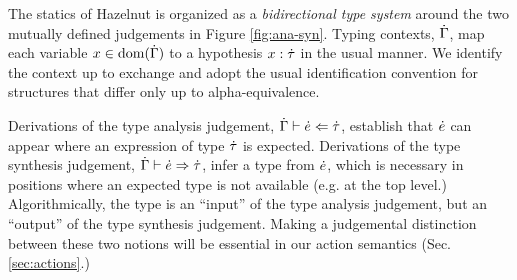 The statics of Hazelnut is organized as a \emph{bidirectional type system} \cite{Pierce:2000:LTI:345099.345100,bidi-tutorial} around the two mutually defined judgements in Figure \ref{fig:ana-syn}. Typing contexts, $\dot{\Gamma}$, map each variable $x \in \text{dom}(\dot{\Gamma})$ to a hypothesis $x : \dot{\tau}$ in the usual manner. We identify the context up to exchange and adopt the usual identification convention for structures that differ only up to alpha-equivalence. 

Derivations of the type analysis judgement, $\dot{\Gamma} \vdash \dot{e} \Leftarrow \dot{\tau}$, establish that $\dot{e}$ can appear where an expression of type $\dot{\tau}$ is expected. Derivations of the type synthesis judgement, $\dot{\Gamma} \vdash \dot{e} \Rightarrow \dot{\tau}$, infer a type from $\dot{e}$, which is necessary in positions where an expected type is not available (e.g. at the top level.) Algorithmically, the type is an ``input'' of the type analysis judgement, but an ``output'' of the type synthesis judgement. %
Making a judgemental distinction between these two notions will be essential in our action semantics (Sec. \ref{sec:actions}.)






